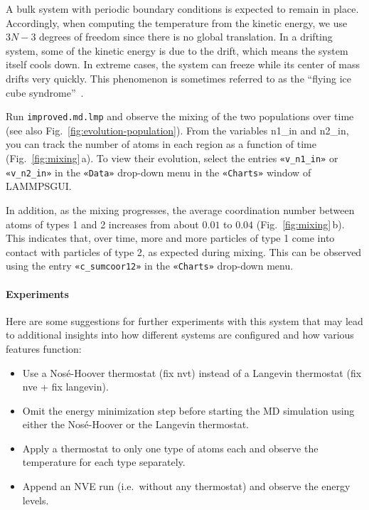 \documentclass[9pt,tutorial]{livecoms}
\newcommand{\lmpcmd}[1]{\colorbox{listing}{\textcolor{command}{\small{#1}}}} %
\newcommand{\flecmd}[1]{\textcolor{command}{\texttt{#1}}} %
\newcommand{\guicmd}[1]{\textcolor{command}{\texttt{«#1»}}} %
\newcommand{\lammpsgui}{\textsf{LAMMPS\textendash GUI}}
\begin{document}
\begin{note}
  A bulk system with periodic boundary conditions is expected to remain
  in place.  Accordingly, when computing the temperature from the
  kinetic energy, we use $3N-3$ degrees of freedom since there is no
  global translation.  In a drifting system, some of the kinetic energy
  is due to the drift, which means the system itself cools down.  In
  extreme cases, the system can freeze while its center of mass drifts
  very quickly.  This phenomenon is sometimes referred to as the
  ``flying ice cube syndrome''~\cite{wong2016good}.
\end{note}
Run \flecmd{improved.md.lmp} and observe the mixing of the two populations
over time (see also Fig.~\ref{fig:evolution-population}).  From the
variables \lmpcmd{n1\_in} and \lmpcmd{n2\_in}, you can track the number
of atoms in each region as a function of time
(Fig.~\ref{fig:mixing}\,a).  To view their evolution, select the entries
\guicmd{v\_n1\_in} or \guicmd{v\_n2\_in} in the \guicmd{Data} drop-down
menu in the \guicmd{Charts} window of \lammpsgui{}.

In addition, as the mixing progresses, the average coordination number
between atoms of types 1 and 2 increases from about $0.01$ to $0.04$
(Fig.~\ref{fig:mixing}\,b).  This indicates that, over time, more and
more particles of type 1 come into contact with particles of type 2, as
expected during mixing.  This can be observed using the entry
\guicmd{c\_sumcoor12} in the \guicmd{Charts} drop-down menu.

\paragraph{Experiments}

Here are some suggestions for further experiments with this system that
may lead to additional insights into how different systems are configured
and how various features function:
\begin{itemize}
\item Use a Nos\'e-Hoover thermostat (\lmpcmd{fix nvt}) instead of a Langevin thermostat
  (\lmpcmd{fix nve} + \lmpcmd{fix langevin}).
\item Omit the energy minimization step before starting the MD simulation using either
the Nos\'e-Hoover or the Langevin thermostat.
\item Apply a thermostat to only one type of atoms each and observe the
  temperature for each type separately.
\item Append an NVE run (i.e.~without any thermostat) and observe the energy levels.
\end{itemize}
\end{document}
